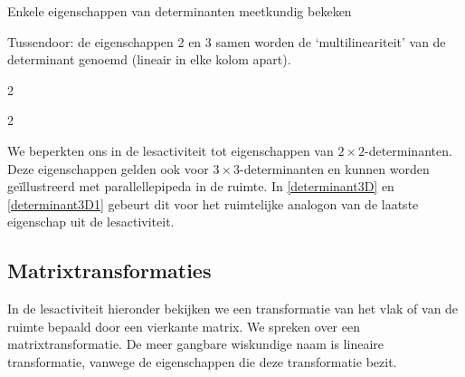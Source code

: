 \begin{lesactiviteit}{Enkele eigenschappen van determinanten meetkundig bekeken}
\begin{vraagenantwoord}
    
\end{vraagenantwoord}
Tussendoor: de eigenschappen 2 en 3 samen worden de `multilineariteit' van de determinant genoemd (lineair in elke kolom apart).

\begin{vraagenantwoord}[resume]

\vraag{$ $}
\begin{multicols}{2}
\end{multicols}

    
\end{vraagenantwoord}



\end{lesactiviteit}

\begin{multicols}{2}

We beperkten ons in de lesactiviteit tot eigenschappen van $2\times 2$-determinanten. Deze eigenschappen gelden ook voor $3\times 3$-determinanten en kunnen worden geïllustreerd met parallellepipeda in de ruimte. In \autoref{determinant3D} en \autoref{determinant3D1} gebeurt dit voor het ruimtelijke analogon van de laatste eigenschap uit de lesactiviteit.




\subsection{Matrixtransformaties}

In de lesactiviteit hieronder bekijken we een transformatie van het vlak of van de ruimte bepaald door een vierkante matrix. We spreken over een matrixtransformatie. De meer gangbare wiskundige naam is lineaire transformatie, vanwege de eigenschappen die deze transformatie bezit.

\end{multicols}

